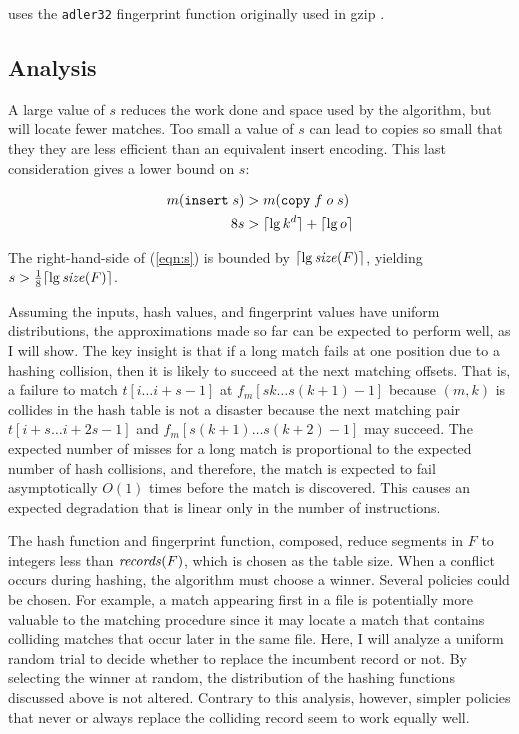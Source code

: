 \documentclass{llncs}
\begin{document}
\xd {} uses the \texttt{adler32} fingerprint function originally used
in gzip \cite{Rsync}.

\subsection{Analysis}

A large value of $s$ reduces the work done and space used by the
algorithm, but will locate fewer matches.  Too small a value of $s$
can lead to copies so small that they they are less efficient than an
equivalent insert encoding.  This last consideration gives a lower
bound on $s$:

\begin{align}
m (\texttt{insert} \; s) &> m (\texttt{copy} \; f \; o \; s) \\
8 s          &> \lceil{\lg k^d}\rceil + \lceil{\lg o}\rceil \label{eqn:s}
\end{align}

\noindent The right-hand-side of (\ref{eqn:s}) is bounded by $\lceil
\lg \textrm{\emph{size}}(F) \rceil$, yielding $s > \frac{1}{8}\lceil \lg \textrm{\emph{size}}(F)
\rceil$.

Assuming the inputs, hash values, and fingerprint values have uniform
distributions, the approximations made so far can be expected to
perform well, as I will show.  The key insight is that if a long match
fails at one position due to a hashing collision, then it is likely to
succeed at the next matching offsets.  That is, a failure to match
$t[i \ldots i+s-1]$ at $f_m[sk \ldots s(k+1)-1]$ because $(m,k)$ is
collides in the hash table is not a disaster because the next matching
pair $t[i+s \ldots i+2s-1]$ and $f_m[s(k+1) \ldots s(k+2)-1]$ may
succeed.  The expected number of misses for a long match is
proportional to the expected number of hash collisions, and therefore,
the match is expected to fail asymptotically $O(1)$ times before the
match is discovered.  This causes an expected degradation that is
linear only in the number of instructions.

The hash function and fingerprint function, composed, reduce segments
in $F$ to integers less than $\textrm{\emph{records}}(F)$, which is chosen as the
table size.  When a conflict occurs during hashing, the algorithm must
choose a winner.  Several policies could be chosen.  For example, a
match appearing first in a file is potentially more valuable to the
matching procedure since it may locate a match that contains
colliding matches that occur later in the same file.  Here, I will
analyze a uniform random trial to decide whether to replace the
incumbent record or not.  By selecting the winner at random, the
distribution of the hashing functions discussed above is not altered.
Contrary to this analysis, however, simpler policies that never or
always replace the colliding record seem to work equally well.
\end{document}
